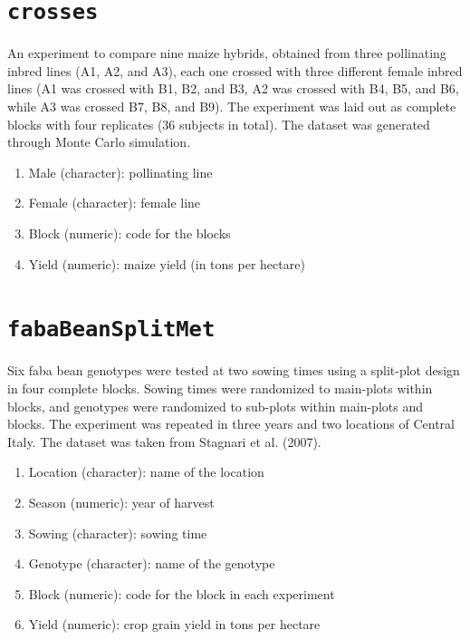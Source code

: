 \documentclass[
  letterpaper,
  DIV=11,
  numbers=noendperiod]{scrreprt}
\providecommand{\tightlist}{%
  \setlength{\itemsep}{0pt}\setlength{\parskip}{0pt}}
\begin{document}
\section*{\texorpdfstring{\texttt{crosses}}{crosses}}\label{crosses}


An experiment to compare nine maize hybrids, obtained from three
pollinating inbred lines (A1, A2, and A3), each one crossed with three
different female inbred lines (A1 was crossed with B1, B2, and B3, A2
was crossed with B4, B5, and B6, while A3 was crossed B7, B8, and B9).
The experiment was laid out as complete blocks with four replicates (36
subjects in total). The dataset was generated through Monte Carlo
simulation.

\begin{enumerate}
\def\labelenumi{\arabic{enumi}.}
\tightlist
\item
  Male (character): pollinating line
\item
  Female (character): female line
\item
  Block (numeric): code for the blocks
\item
  Yield (numeric): maize yield (in tons per hectare)
\end{enumerate}

\section*{\texorpdfstring{\texttt{fabaBeanSplitMet}}{fabaBeanSplitMet}}\label{fabaBeanSplitMet}


Six faba bean genotypes were tested at two sowing times using a
split-plot design in four complete blocks. Sowing times were randomized
to main-plots within blocks, and genotypes were randomized to sub-plots
within main-plots and blocks. The experiment was repeated in three years
and two locations of Central Italy. The dataset was taken from Stagnari
et al. (2007).

\begin{enumerate}
\def\labelenumi{\arabic{enumi}.}
\tightlist
\item
  Location (character): name of the location
\item
  Season (numeric): year of harvest
\item
  Sowing (character): sowing time
\item
  Genotype (character): name of the genotype
\item
  Block (numeric): code for the block in each experiment
\item
  Yield (numeric): crop grain yield in tons per hectare
\end{enumerate}
\end{document}
